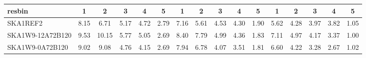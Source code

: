 \begin{table}[!htp]
{{\begin{tabular}{|lccccc||ccccc||ccccc|}
 resbin  &1 & 2 & 3 & 4 & 5 & 1 & 2 & 3 & 4 & 5 & 1 & 2 & 3 & 4 & 5 \\ \hline
SKA1REF2 & 8.15 \cellcolor{blue!18.00} & 6.71 \cellcolor{red!18.00} & 5.17 \cellcolor{green!35.05} & 4.72 \cellcolor{orange!44.60} & 2.79 \cellcolor{purple!60.00} & 7.16 \cellcolor{blue!18.00} & 5.61 \cellcolor{red!18.00} & 4.53 \cellcolor{green!39.00} & 4.30 \cellcolor{orange!57.04} & 1.90 \cellcolor{purple!60.00} & 5.62 \cellcolor{blue!18.00} & 4.28 \cellcolor{red!21.36} & 3.97 \cellcolor{green!50.56} & 3.82 \cellcolor{orange!60.00} & 1.05 \cellcolor{purple!60.00}\\ \hline 
SKA1W9-12A72B120 & 9.53 \cellcolor{blue!60.00} & 10.15 \cellcolor{red!60.00} & 5.77 \cellcolor{green!60.00} & 5.05 \cellcolor{orange!60.00} & 2.69 \cellcolor{purple!18.00} & 8.40 \cellcolor{blue!60.00} & 7.79 \cellcolor{red!60.00} & 4.99 \cellcolor{green!60.00} & 4.36 \cellcolor{orange!60.00} & 1.83 \cellcolor{purple!27.33} & 7.11 \cellcolor{blue!60.00} & 4.97 \cellcolor{red!60.00} & 4.17 \cellcolor{green!60.00} & 3.37 \cellcolor{orange!43.57} & 1.00 \cellcolor{purple!18.00}\\ \hline 
SKA1W9-0A72B120 & 9.02 \cellcolor{blue!44.48} & 9.08 \cellcolor{red!46.94} & 4.76 \cellcolor{green!18.00} & 4.15 \cellcolor{orange!18.00} & 2.69 \cellcolor{purple!18.00} & 7.94 \cellcolor{blue!44.42} & 6.78 \cellcolor{red!40.54} & 4.07 \cellcolor{green!18.00} & 3.51 \cellcolor{orange!18.00} & 1.81 \cellcolor{purple!18.00} & 6.60 \cellcolor{blue!45.62} & 4.22 \cellcolor{red!18.00} & 3.28 \cellcolor{green!18.00} & 2.67 \cellcolor{orange!18.00} & 1.02 \cellcolor{purple!34.80}\\ \hline 
\end{tabular}}
\hspace{1cm} 
}
\end{table}
